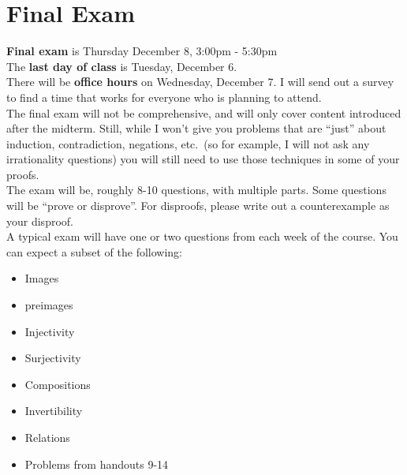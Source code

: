 \documentclass[12pt]{article}
\begin{document}


\newpage
\section[Final Exam]{Final Exam}

\textbf{Final exam} is Thursday December 8, 3:00pm - 5:30pm
\\

\noindent The \textbf{last day of class} is Tuesday, December 6. 
\\

\noindent There will be \textbf{office hours} on Wednesday, December 7. I will send out a survey to find a time that works for everyone who is planning to attend.%
\\




The final exam will not be comprehensive, and will only cover content introduced after the midterm. Still, while I won't give you problems that are ``just'' about induction, contradiction, negations, etc.~(so for example, I will not ask any irrationality questions) you will still need to use those techniques in some of your proofs.
\\

The exam will be, roughly 8-10 questions, with multiple parts. Some questions will be ``prove or disprove''. For disproofs, please write out a counterexample as your disproof.
\\

A typical exam will have one or two questions from each week of the course. You can expect a subset of the following:
\begin{itemize}
\item Images
\item preimages
\item Injectivity 
\item Surjectivity
\item Compositions
\item Invertibility
\item Relations
\item Problems from handouts 9-14
\end{itemize}




 
\end{document}
